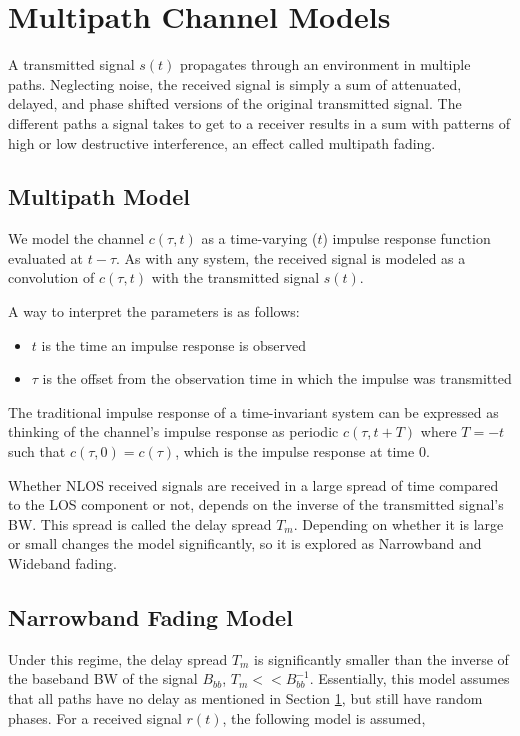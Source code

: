 \documentclass[12pt]{report} %
\begin{document}
\chapter{Multipath Channel Models}
\label{multipath_ch_model}
A transmitted signal $s(t)$ propagates through an environment in multiple paths.
Neglecting noise, the received signal is simply a sum of attenuated, delayed,
and phase shifted versions of the original transmitted signal. The different
paths a signal takes to get to a receiver results in a sum with patterns of high
or low destructive interference, an effect called multipath fading.
\section{Multipath Model}
We model the channel $c(\tau,t)$ as a time-varying ($t$) impulse response function evaluated at $t - \tau$. As with any system, the received signal is modeled as a convolution of $c(\tau,t)$ with the transmitted signal $s(t)$.

A way to interpret the parameters is as follows:
\begin{itemize}
  \item $t$ is the time an impulse response is observed
  \item $\tau$ is the offset from the observation time in which the impulse was transmitted
\end{itemize}

The traditional impulse response of a time-invariant system can be expressed as
thinking of the channel's impulse response as periodic $c(\tau,t + T)$ where $T
  = -t$ such that  $c(\tau,0) = c(\tau)$, which is the impulse response at time
$0$.

Whether \gls{NLOS} received signals are received in a large spread of time
compared to the \gls{LOS} component or not, depends on the inverse of the
transmitted signal's \gls{BW}. This spread is called the delay spread $T_m$.
Depending on whether it is large or small changes the model significantly, so it
is explored as Narrowband and Wideband fading.

\section{Narrowband Fading Model}
Under this regime, the delay spread $T_m$ is significantly smaller than the inverse of the baseband \gls{BW} of the signal $B_{bb}$, $T_m << B^{-1}_{bb}$. Essentially, this model assumes that all paths have no delay as mentioned in Section \ref{multipath_ch_model}, but still have random phases. For a received signal $r(t)$, the following model is assumed,
\end{document}
